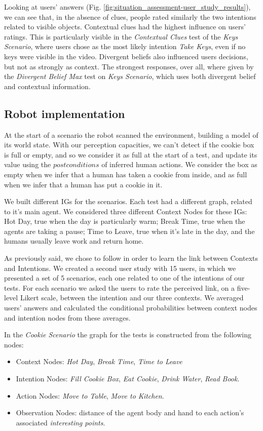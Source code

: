 Looking at users' answers (Fig. \ref{fig:situation_assessment-user_study_results}), we can see that, in the absence of clues, people rated similarly the two intentions related to visible objects. Contextual clues had the highest influence on users' ratings. This is particularly visible in the \textit{Contextual Clues} test of the \textit{Keys Scenario}, where users chose as the most likely intention \textit{Take Keys}, even if no keys were visible in the video. Divergent beliefs also influenced users decisions, but not as strongly as context. The strongest responses, over all, where given by the \textit{Divergent Belief Max} test on \textit{Keys Scenario}, which uses both divergent belief and contextual information.

\subsection{Robot implementation}
At the start of a scenario the robot scanned the environment, building a model of its world state. With our perception capacities, we can't detect if the cookie box is full or empty, and so we consider it as full at the start of a test, and update its value using the $postconditions$ of inferred human actions. We consider the box as empty when we infer that a human has taken a cookie from inside, and as full when we infer that a human has put a cookie in it.

We built different IGs for the scenarios. Each test had a different graph, related to it's main agent. We considered three different Context Nodes for these IGs: Hot Day, true when the day is particularly warm; Break Time, true when the agents are taking a pause; Time to Leave, true when it's late in the day, and the humans usually leave work and return home.

As previously said, we chose to follow \cite{Liu2014} in order to learn the link between Contexts and Intentions. We created a second user study with 15 users, in which we presented a set of 5 scenarios, each one related to one of the intentions of our tests. For each scenario we asked the users to rate the perceived link, on a five-level Likert scale, between the intention and our three contexts. We averaged users' answers and calculated the conditional probabilities between context nodes and intention nodes from these averages.


In the \textit{Cookie Scenario} the graph for the tests is constructed from the following nodes:
\begin{itemize}
\item Context Nodes: \textit{Hot Day}, \textit{Break Time}, \textit{Time to Leave}
\item Intention Nodes: \textit{Fill Cookie Box}, \textit{Eat Cookie}, \textit{Drink Water}, \textit{Read Book}.
\item Action Nodes: \textit{Move to Table}, \textit{Move to Kitchen}.
\item Observation Nodes: distance of the agent body and hand to each action's associated \textit{interesting points}.
\end{itemize}

